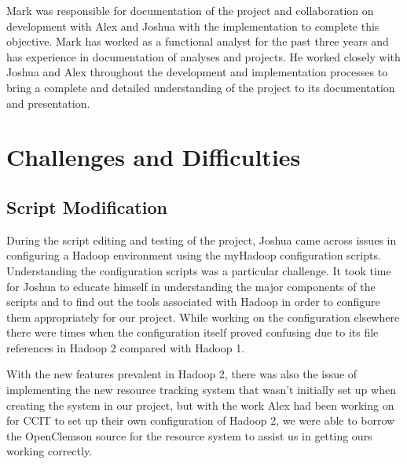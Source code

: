 \documentclass[conference]{IEEEtran}
\begin{document}
			Mark was responsible for documentation of the project and collaboration on development with Alex and Joshua with the implementation to complete this objective. Mark has worked as a functional analyst for the past three years and has experience in documentation of analyses and projects. He worked closely with Joshua and Alex throughout the development and implementation processes to bring a complete and detailed understanding of the project to its documentation and presentation.

		\section{Challenges and Difficulties}
			\subsection{Script Modification}
				During the script editing and testing of the project, Joshua came across issues in configuring a Hadoop environment using the myHadoop configuration scripts. Understanding the configuration scripts was a particular challenge. It took time for Joshua to educate himself in understanding the major components of the scripts and to find out the tools associated with Hadoop in order to configure them appropriately for our project. While working on the configuration elsewhere there were times when the configuration itself proved confusing due to its file references in Hadoop 2 compared with Hadoop 1. 

                With the new features prevalent in Hadoop 2, there was also the issue of implementing the new resource tracking system that wasn’t initially set up when creating the system in our project, but with the work Alex had been working on for CCIT to set up their own configuration of Hadoop 2, we were able to borrow the OpenClemson source\cite{openclemson} for the resource system to assist us in getting ours working correctly.
\end{document}
